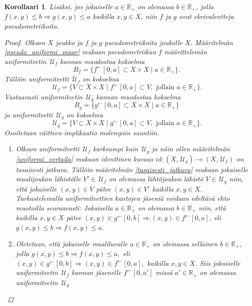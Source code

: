 \documentclass[12pt,a4paper,leqno]{report}
\newcommand{\R}{\mathbb{R}}
\newcommand{\U}{\,\mathcal{U}}
\theoremstyle{plain}
\newtheorem{kor}[equation]{Korollaari}
\theoremstyle{definition}
\theoremstyle{remark}
\begin{document}
\begin{kor}
Lisäksi, jos jokaiselle $a\in\R_+$ on olemassa $b\in\R_+$, jolla $f(x,y)\leq b \Rightarrow g(x,y)\leq a$ kaikilla $x,y\in X$, niin $f$ ja $g$ ovat ekvivalentteja pseudometriikoita.
\begin{proof}
Olkoon $X$ joukko ja $f$ ja $g$ pseudometriikoita joukolle $X$. 
Määritelmän \ref{pseudo_uniformi_maar} mukaan pseudometriikan $f$ määrittelemän uniformiteetin $\U_f$ kannan muodostaa kokoelma 
$$B_f=\{ f^{\leftarrow}[0,a]\subset X\times X\mid a\in\R_+\}.$$ 
Tällöin uniformiteetti $ \U_f$ on kokoelma 
$$\U_f=\{ V\subset X\times X\mid f^{\leftarrow}[0,a]\subset V, \text{ jollain } a\in\R_+\}.$$
Vastaavasti uniformiteetin $\U_g$ kannan muodostaa kokoelma $$B_g=\{ g^{\leftarrow}[0,a]\subset X\times X\mid a\in\R_+\}$$ ja uniformiteetti $ \U_g$ on kokoelma 
$$\U_g=\{ V\subset X\times X\mid g^{\leftarrow}[0,a]\subset V, \text{ jollain } a\in\R_+\}.$$ 
Osoitetaan väitteen implikaatio molempiin suuntiin.
\begin{enumerate}
\item[$\Rightarrow$] 
Olkoon uniformiteetti $\U_f$ karkeampi kuin $\U_g$ ja näin ollen määritelmän \ref{uniformi_vertailu} mukaan identtinen kuvaus $id\colon(X,\U_g)\rightarrow(X,\U_f)$ on tasaisesti jatkuva. 
Tällöin määritelmän \ref{tasaisesti_jatkuva} 
mukaan jokaiselle maalijoukon %
lähistölle $V'\in\U_f $ on olemassa %
lähtöjoukon lähistö $V\in\U_g $ niin, että 
jokaiselle $(x,y)\in V$ pätee $(x,y)\in V'$ kaikilla $x,y\in X$. 
Tarkas\-tele\-mal\-la uniformiteettien kantojen jäseniä 
voidaan edeltävä ehto muotoilla seuraavasti: 
Jokaisella $a\in\R_+$ on olemassa $b\in\R_+$ niin, 
että kaikilla $x,y\in X$ pätee 
$(x,y)\in g^{\leftarrow}[0,b]\Rightarrow (x,y)\in f^{\leftarrow}[0,a]$, 
eli $g(x,y)\leq b\Rightarrow f(x,y) \leq a$.
\item[$\Leftarrow$] Oletetaan, että jokaiselle reaaliluvulle 
$a\in\R_+$ on olemassa sellainen $b\in\R_+$, jolla 
$g(x,y)\leq b \Rightarrow f(x,y)\leq a,
$ %
eli %
$(x,y)\in g^{\leftarrow}[0,b]\Rightarrow (x,y)\in f^{\leftarrow}[0,a],$ 
kaikilla $x,y\in X$. 
Siis jokaiselle uniformiteetin $\U_f$ kannan jäsenelle 
$f^{\leftarrow}[0,a']$ missä $a'\in\R_+ $ on olemassa uniformiteetin $\U_g$ 

\end{enumerate}
\end{proof}
\end{kor}
\end{document}
